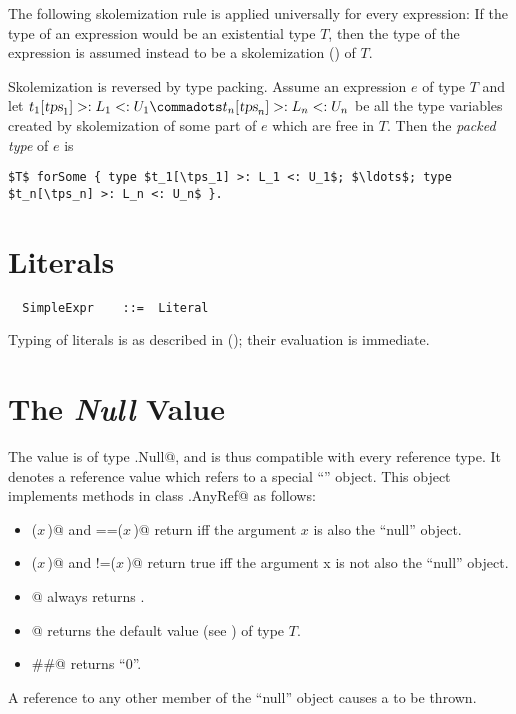 The following skolemization rule is applied universally for every
expression: If the type of an expression would be an existential type
$T$, then the type of the expression is assumed instead to be a
skolemization () of $T$.

Skolemization is reversed by type packing. Assume an expression $e$ of
type $T$ and let $t_1[\tps_1] >: L_1 <: U_1 \commadots t_n[\tps_n] >: L_n <: U_n$ be
all the type variables created by skolemization of some part of $e$ which are free in $T$.
Then the {\em packed type} of $e$ is
\begin{lstlisting}
$T$ forSome { type $t_1[\tps_1] >: L_1 <: U_1$; $\ldots$; type $t_n[\tps_n] >: L_n <: U_n$ }.
\end{lstlisting}

\section{Literals}\label{sec:literal-exprs}

\syntax\begin{lstlisting}
  SimpleExpr    ::=  Literal
\end{lstlisting}

Typing of literals is as described in (); their
evaluation is immediate.


\section{The {\em Null} Value}

The  value is of type \lstinline@scala.Null@, and is thus
compatible with every reference type.  It denotes a reference value
which refers to a special ``\lstinline@null@'' object. This object
implements methods in class \lstinline@scala.AnyRef@ as follows:
\begin{itemize}
\item
\lstinline@eq($x\,$)@ and \lstinline@==($x\,$)@ return  iff the
argument $x$ is also the ``null'' object.
\item
\lstinline@ne($x\,$)@ and \lstinline@!=($x\,$)@ return true iff the 
argument x is not also the ``null'' object.
\item
\lstinline@isInstanceOf[$T\,$]@ always returns .
\item
\lstinline@asInstanceOf[$T\,$]@ returns the default value (see ) of type $T$.
\item
\lstinline@##@ returns ``0''.
\end{itemize}
A reference to any other member of the ``null'' object causes a
 to be thrown. 

